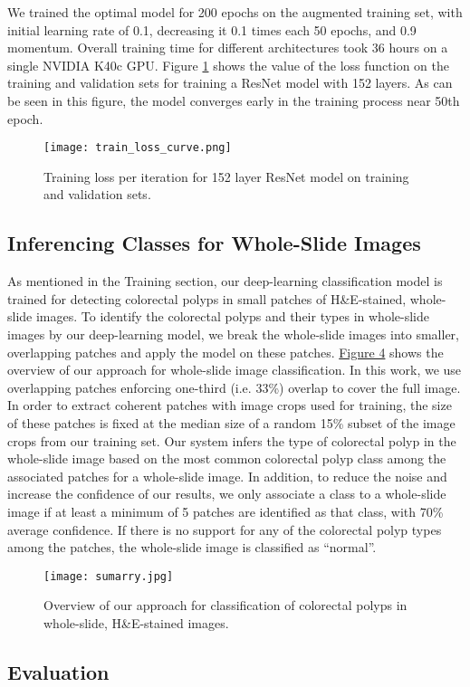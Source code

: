 \documentclass[review]{elsarticle}
\begin{document}
We trained the optimal model for 200 epochs on the augmented training set, with initial learning rate of 0.1, decreasing it 0.1 times each 50 epochs, and 0.9 momentum. Overall training time for different architectures took 36 hours on a single NVIDIA K40c GPU. Figure \ref{fig:loss} shows the value of the loss function on the training and validation sets for training a ResNet model with 152 layers. As can be seen in this figure, the model converges early in the training process near 50th epoch.

\begin{figure}[ht!]
\centering
\texttt{[image: train\_loss\_curve.png]}
\caption{Training loss per iteration for 152 layer ResNet model on training and validation sets.}
\label{fig:loss}
\end{figure}\subsection{Inferencing Classes for Whole-Slide Images}\label{inference}
As mentioned in the Training section, our deep-learning classification model is trained for detecting colorectal polyps in small patches of H\&E-stained, whole-slide images. To identify the colorectal polyps and their types in whole-slide images by our deep-learning model, we break the whole-slide images into smaller, overlapping patches and apply the model on these patches. \hyperref[fig:overview]{Figure 4} shows the overview of our approach for whole-slide image classification. In this work, we use overlapping patches enforcing one-third (i.e. 33\%) overlap to cover the full image. In order to extract coherent patches with image crops used for training, the size of these patches is fixed at the median size of a random 15\% subset of the image crops from our training set. Our system infers the type of colorectal polyp in the whole-slide image based on the most common colorectal polyp class among the associated patches for a whole-slide image. In addition, to reduce the noise and increase the confidence of our results, we only associate a class to a whole-slide image if at least a minimum of 5 patches are identified as that class, with 70\% average confidence. If there is no support for any of the colorectal polyp types among the patches, the whole-slide image is classified as “normal”.
\vspace*{0.5cm}\begin{figure}[h!]
\centering
\texttt{[image: sumarry.jpg]}
\caption{Overview of our approach for classification of colorectal polyps in whole-slide, H\&E-stained images.}
\label{fig:overview}
\end{figure}\subsection{Evaluation}\label{evaluation}
\end{document}
